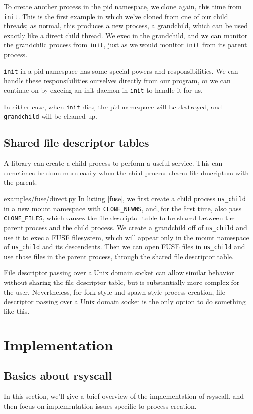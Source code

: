 \documentclass[sigplan]{acmart}
\begin{document}
To create another process in the pid namespace,
we clone again, this time from \texttt{init}.
This is the first example in which we've cloned from one of our child threads;
as normal, this produces a new process, a grandchild,
which can be used exactly like a direct child thread.
We exec in the grandchild,
and we can monitor the grandchild process from \texttt{init},
just as we would monitor \texttt{init} from its parent process.

\texttt{init} in a pid namespace has some special powers and responsibilities.
We can handle these responsibilities ourselves directly from our program,
or we can continue on by execing an init daemon in \texttt{init} to handle it for us.

In either case, when \texttt{init} dies,
the pid namespace will be destroyed,
and \texttt{grandchild} will be cleaned up.
\subsection{Shared file descriptor tables}\label{shared_fd_table}
A library can create a child process to perform a useful service.
This can sometimes be done more easily when the child process shares file descriptors with the parent.


{examples/fuse/direct.py}
In listing \ref{fuse},
we first create a child process \verb|ns_child| in a new mount namespace with \verb|CLONE_NEWNS|,
and, for the first time, also pass \verb|CLONE_FILES|,
which causes the file descriptor table to be shared between the parent process and the child process.
We create a grandchild off of \verb|ns_child|
and use it to exec a FUSE filesystem,
which will appear only in the mount namespace of \verb|ns_child| and its descendents.
Then we can open FUSE files in \verb|ns_child|
and use those files in the parent process,
through the shared file descriptor table.

File descriptor passing over a Unix domain socket
can allow similar behavior without sharing the file descriptor table,
but is substantially more complex for the user.
Nevertheless, for fork-style and spawn-style process creation,
file descriptor passing over a Unix domain socket
is the only option to do something like this.
\section{Implementation}\label{implementation}
\subsection{Basics about rsyscall}
In this section, we'll give a brief overview of the implementation of rsyscall,
and then focus on implementation issues specific to process creation.
\end{document}
